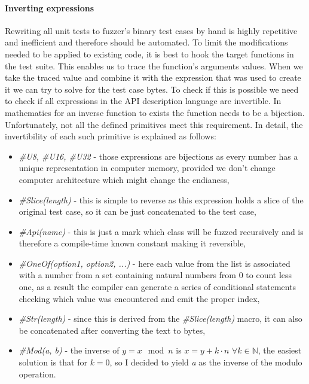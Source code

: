 \paragraph{Inverting expressions}
Rewriting all unit tests to fuzzer's binary test cases by hand is highly repetitive and inefficient and therefore should be automated. To limit the modifications needed to be applied to existing code, it is best to hook the target functions in the test suite. This enables us to trace the function's arguments values. When we take the traced value and combine it with the expression that was used to create it we can try to solve for the test case bytes. To check if this is possible we need to check if all expressions in the API description language are invertible. In mathematics for an inverse function to exists the function needs to be a bijection. Unfortunately, not all the defined primitives meet this requirement. In detail, the invertibility of each such primitive is explained as follows:
\begin{itemize}
    \item \textit{\#U8, \#U16, \#U32} - those expressions are bijections as every number has a unique representation in computer memory, provided we don't change computer architecture which might change the endianess,
    \item \textit{\#Slice(length)} - this is simple to reverse as this expression holds a slice of the original test case, so it can be just concatenated to the test case,
    \item \textit{\#Api(name)} - this is just a mark which class will be fuzzed recursively and is therefore a compile-time known constant making it reversible,
    \item \textit{\#OneOf(option1, option2, ...)} - here each value from the list is associated with a number from a set containing natural numbers from 0 to count less one, as a result the compiler can generate a series of conditional statements checking which value was encountered and emit the proper index,
    \item \textit{\#Str(length)} - since this is derived from the \textit{\#Slice(length)} macro, it can also be concatenated after converting the text to bytes,
    \item \textit{\#Mod(a, b)} - the inverse of $y = x \mod n$ is $x = y + k \cdot n$ $\forall k \in \mathbb{N}$, the easiest solution is that for $ k=0 $, so I decided to yield \textit{a} as the inverse of the modulo operation.
\end{itemize}
